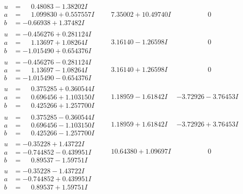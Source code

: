 \documentclass[1p]{elsarticle_modified}
\theoremstyle{definition}
\begin{document}
$$\begin{array}{c|c|c}
\begin{aligned}
u &= \phantom{-}0.48083 - 1.38202 I \\
a &= \phantom{-}1.099830 + 0.557557 I \\
b &= -0.66938 + 1.37482 I\end{aligned}
 & \phantom{-}7.35002 + 10.49740 I & \phantom{-0.000000 } 0 \\ \hline\begin{aligned}
u &= -0.456276 + 0.281124 I \\
a &= \phantom{-}1.13697 + 1.08264 I \\
b &= -1.015490 + 0.654376 I\end{aligned}
 & \phantom{-}3.16140 - 1.26598 I & \phantom{-0.000000 } 0 \\ \hline\begin{aligned}
u &= -0.456276 - 0.281124 I \\
a &= \phantom{-}1.13697 - 1.08264 I \\
b &= -1.015490 - 0.654376 I\end{aligned}
 & \phantom{-}3.16140 + 1.26598 I & \phantom{-0.000000 } 0 \\ \hline\begin{aligned}
u &= \phantom{-}0.375285 + 0.360544 I \\
a &= \phantom{-}0.696456 + 1.103150 I \\
b &= \phantom{-}0.425266 + 1.257700 I\end{aligned}
 & \phantom{-}1.18959 - 1.61842 I & -3.72926 - 3.76453 I \\ \hline\begin{aligned}
u &= \phantom{-}0.375285 - 0.360544 I \\
a &= \phantom{-}0.696456 - 1.103150 I \\
b &= \phantom{-}0.425266 - 1.257700 I\end{aligned}
 & \phantom{-}1.18959 + 1.61842 I & -3.72926 + 3.76453 I \\ \hline\begin{aligned}
u &= -0.35228 + 1.43722 I \\
a &= -0.744852 - 0.439951 I \\
b &= \phantom{-}0.89537 - 1.59751 I\end{aligned}
 & \phantom{-}10.64380 + 1.09697 I & \phantom{-0.000000 } 0 \\ \hline\begin{aligned}
u &= -0.35228 - 1.43722 I \\
a &= -0.744852 + 0.439951 I \\
b &= \phantom{-}0.89537 + 1.59751 I\end{aligned}

\end{array}$$
\end{document}
